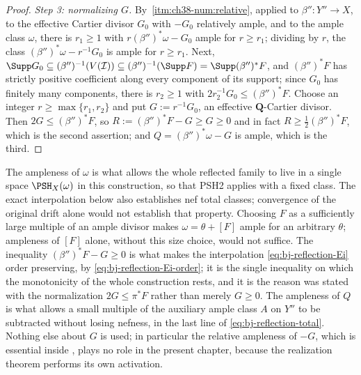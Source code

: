 \begin{proof}
\emph{Step 3: normalizing $G$.}
By \,\cref{itm:ch38-num:relative},
applied to $\beta'':Y''\to X$, to the effective Cartier divisor $G_0$
with $-G_0$ relatively ample, and to the ample class $\omega$, there is
$r_1\ge1$ with $r(\beta'')^*\omega-G_0$ ample for $r\ge r_1$; dividing
by $r$, the class $(\beta'')^*\omega-r^{-1}G_0$ is ample for
$r\ge r_1$.  Next, $\Supp G_0\subseteq(\beta'')^{-1}(V(\mathcal I))
\subseteq(\beta'')^{-1}(\Supp F)=\Supp(\beta'')^*F$, and $(\beta'')^*F$
has strictly positive coefficient along every component of its support;
since $G_0$ has finitely many components, there is $r_2\ge1$ with
$2r_2^{-1}G_0\le(\beta'')^*F$.  Choose an integer
$r\ge\max\{r_1,r_2\}$ and put
$G:=r^{-1}G_0$, an effective $\mathbf Q$-Cartier divisor.  Then
$2G\le(\beta'')^*F$, so $R:=(\beta'')^*F-G\ge G\ge0$ and in fact
$R\ge\frac12(\beta'')^*F$, which is the second assertion; and
$Q=(\beta'')^*\omega-G$ is ample, which is the third.
\end{proof}

\begin{remark}
\label{rem:ch39-fixed-pole-uses}
The ampleness of $\omega$ is what allows the whole reflected family to
live in a single space $\PSH_X(\omega)$ in this construction, so that
PSH2 applies with a fixed class.  The exact interpolation below also
establishes nef total classes; convergence of the original drift alone
would not establish that property.  Choosing $F$ as a sufficiently large
multiple of an ample divisor makes $\omega=\theta+[F]$ ample for an
arbitrary $\theta$; ampleness of $[F]$ alone, without this size choice,
would not suffice.  The inequality $(\beta'')^*F-G\ge0$ is what makes the
interpolation \eqref{eq:bj-reflection-Ei} order preserving, by
\eqref{eq:bj-reflection-Ei-order}; it is the single inequality on which the
monotonicity of the whole construction rests, and it is the reason
 was stated with the normalization
$2G\le\pi^*F$ rather than merely $G\ge0$.  The ampleness of $Q$ is
what allows a small multiple of the auxiliary ample class $A$ on $Y''$
to be subtracted without losing nefness, in the last line of
\eqref{eq:bj-reflection-total}.  Nothing else about $G$ is used; in
particular the relative ampleness of $-G$, which is essential inside
, plays no role in the present
chapter, because the realization theorem performs its own activation.
\end{remark}

